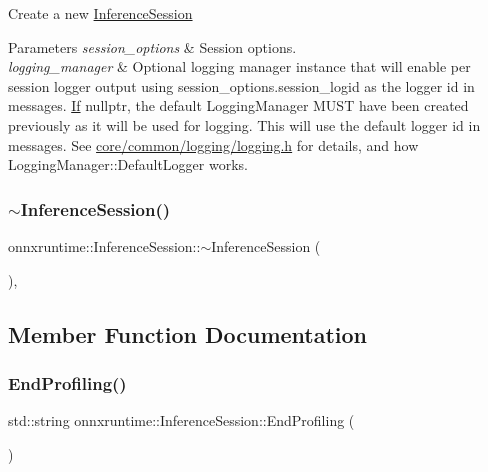 Create a new \mbox{\hyperlink{classonnxruntime_1_1InferenceSession}{Inference\+Session}} 
\begin{DoxyParams}{Parameters}
{\em session\+\_\+options} & Session options. \\
\hline
{\em logging\+\_\+manager} & Optional logging manager instance that will enable per session logger output using session\+\_\+options.\+session\+\_\+logid as the logger id in messages. \mbox{\hyperlink{classonnxruntime_1_1If}{If}} nullptr, the default Logging\+Manager M\+U\+ST have been created previously as it will be used for logging. This will use the default logger id in messages. See \mbox{\hyperlink{logging_8h}{core/common/logging/logging.\+h}} for details, and how Logging\+Manager\+::\+Default\+Logger works. \\
\hline
\end{DoxyParams}
\mbox{\label{classonnxruntime_1_1InferenceSession_ac65abf4735716f82dd91a6dc3ad0000e}} 
\subsubsection{\texorpdfstring{$\sim$\+Inference\+Session()}{~InferenceSession()}}
{\footnotesize\ttfamily onnxruntime\+::\+Inference\+Session\+::$\sim$\+Inference\+Session (\begin{DoxyParamCaption}{ }\end{DoxyParamCaption})\hspace{0.3cm}{\ttfamily [virtual]}, {\ttfamily [default]}}



\subsection{Member Function Documentation}
\mbox{\label{classonnxruntime_1_1InferenceSession_ac9e69b0d77c3afb6c0fcad0969cfca17}} 
\subsubsection{\texorpdfstring{End\+Profiling()}{EndProfiling()}}
{\footnotesize\ttfamily std\+::string onnxruntime\+::\+Inference\+Session\+::\+End\+Profiling (\begin{DoxyParamCaption}{ }\end{DoxyParamCaption})}

